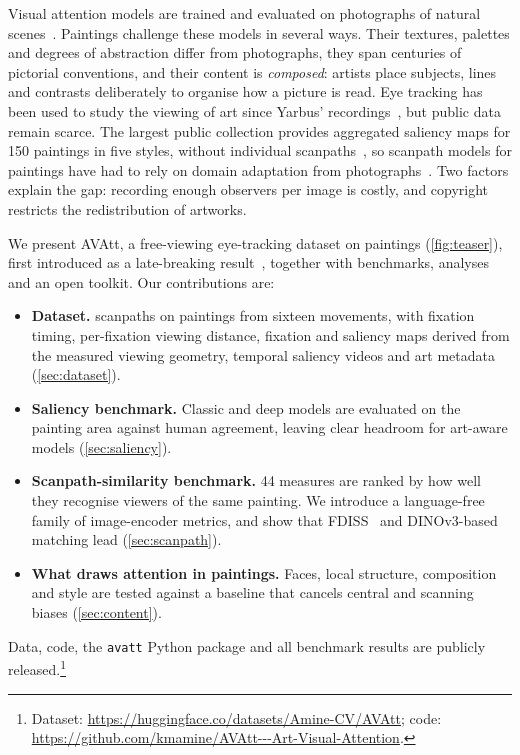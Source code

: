 \documentclass[10pt,twocolumn,letterpaper]{article}
\newcommand{\avatt}{AVAtt}
\begin{document}
Visual attention models are trained and evaluated on photographs of natural
scenes~\cite{judd2009mit,jiang2015salicon,borji2015cat2000}. Paintings challenge these models in several ways.
Their textures, palettes and degrees of abstraction differ from photographs, they span centuries of pictorial
conventions, and their content is \emph{composed}: artists place subjects, lines and contrasts deliberately to
organise how a picture is read. Eye tracking has been used to study the viewing of art since Yarbus'
recordings~\cite{yarbus1967,nodine1993art,quiroga2011art,massaro2012art,kerkouri2026divergent}, but public data remain scarce. The
largest public collection provides aggregated saliency maps for 150 paintings in five styles, without individual
scanpaths~\cite{lemeur2020paintings}, so scanpath models for paintings have had to rely on domain adaptation from photographs~\cite{kerkouri2022domain,tliba2022selfsupervised,kerkouri2026spgen}. Two factors explain the gap: recording enough observers per image is costly, and
copyright restricts the redistribution of artworks.

We present \avatt, a free-viewing eye-tracking dataset on paintings (\cref{fig:teaser}), first introduced as a
late-breaking result~\cite{kerkouri2024avatt}, together with benchmarks, analyses and an open toolkit. Our
contributions are:
\begin{itemize}
  \item \textbf{Dataset.} \nScanpaths{} scanpaths on \nImages{} paintings from sixteen movements, with fixation timing,
  per-fixation viewing distance, fixation and saliency maps derived from the measured viewing geometry, temporal
  saliency videos and art metadata (\cref{sec:dataset}).
  \item \textbf{Saliency benchmark.} Classic and deep models are evaluated on the painting area against human
  agreement, leaving clear headroom for art-aware models (\cref{sec:saliency}).
  \item \textbf{Scanpath-similarity benchmark.} 44 measures are ranked by how well they recognise viewers of the same
  painting. We introduce a language-free family of image-encoder metrics, and show that FDISS~\cite{kerkouri2026fdiss}
  and DINOv3-based matching lead (\cref{sec:scanpath}).
  \item \textbf{What draws attention in paintings.} Faces, local structure, composition and style are tested against
  a baseline that cancels central and scanning biases (\cref{sec:content}).
\end{itemize}
Data, code, the \texttt{avatt} Python package and all benchmark results are publicly
released.\footnote{Dataset: \url{https://huggingface.co/datasets/Amine-CV/AVAtt}; code:
\url{https://github.com/kmamine/AVAtt---Art-Visual-Attention}.}
\end{document}
